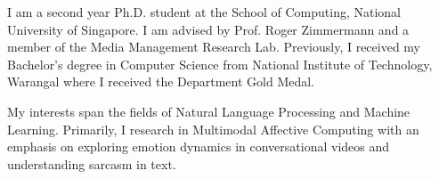 

\begin{cvparagraph}

I am a second year Ph.D. student at the School of Computing, National University of Singapore. I am advised by Prof. Roger Zimmermann and a member of the Media Management Research Lab. Previously, I received my Bachelor's degree in Computer Science from National Institute of Technology, Warangal where I received the Department Gold Medal.

My interests span the fields of Natural Language Processing and Machine Learning. Primarily, I research in Multimodal Affective Computing with an emphasis on exploring emotion dynamics in conversational videos and understanding sarcasm in text.
\end{cvparagraph}
